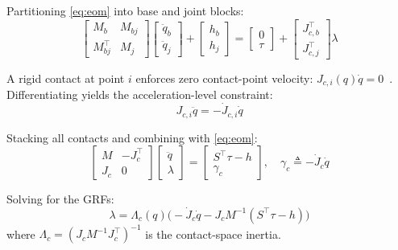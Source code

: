 Partitioning \eqref{eq:eom} into base and joint blocks:
\begin{equation}\label{eq:partition}
  \begin{bmatrix}M_b & M_{bj} \\ M_{bj}^\top & M_j\end{bmatrix}
  \begin{bmatrix}\ddot{q}_b \\ \ddot{q}_j\end{bmatrix}
  +\begin{bmatrix}h_b \\ h_j\end{bmatrix}
  =\begin{bmatrix}0 \\ \tau\end{bmatrix}
  +\begin{bmatrix}J_{c,b}^\top \\ J_{c,j}^\top\end{bmatrix}\lambda
\end{equation}

A rigid contact at point $i$ enforces zero contact-point
velocity: $J_{c,i}(q)\dot{q}=0$~\cite{righetti2011inverse}.
Differentiating yields the acceleration-level constraint:
\begin{equation}\label{eq:contact_acc}
  J_{c,i}\ddot{q} = -\dot{J}_{c,i}\dot{q}
\end{equation}

Stacking all contacts and combining with \eqref{eq:eom}:
\begin{equation}\label{eq:KKT}
  \begin{bmatrix}M & -J_c^\top \\ J_c & 0\end{bmatrix}
  \begin{bmatrix}\ddot{q} \\ \lambda\end{bmatrix}
  =\begin{bmatrix}S^\top\tau-h \\ \gamma_c\end{bmatrix},
  \quad \gamma_c\triangleq-\dot{J}_c\dot{q}
\end{equation}

Solving for the GRFs:
\begin{equation}\label{eq:GRF}
  \lambda = \Lambda_c(q)\bigl(-\dot{J}_c\dot{q}-J_cM^{-1}(S^\top\tau-h)\bigr)
\end{equation}
where $\Lambda_c=(J_cM^{-1}J_c^\top)^{-1}$ is the contact-space inertia.

